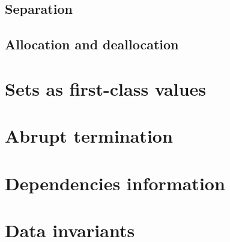 
\subsection{Separation}
\absent


\subsection{Allocation and deallocation}
\absent


\section{Sets as first-class values}
\nodiff


\section{Abrupt termination}
\absent


\section{Dependencies information}
\absent


\section{Data invariants}
\label{sec:invariants}

